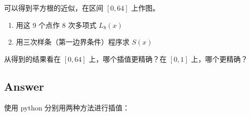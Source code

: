 \documentclass[11pt]{article}
\providecommand{\tightlist}{%
      \setlength{\itemsep}{0pt}\setlength{\parskip}{0pt}}
\begin{document}
可以得到平方根的近似，在区间 \([0, 64]\) 上作图。

\begin{enumerate}
\def\labelenumi{(\arabic{enumi})}
\tightlist
\item
  用这 9 个点作 8 次多项式 \(L_8(x)\)
\item
  用三次样条（第一边界条件）程序求 \(S(x)\)
\end{enumerate}

从得到的结果看在 \([0, 64]\) 上，哪个插值更精确？在 \([0, 1]\)
上，哪个更精确？

\subsection{Answer}\label{answer}

使用 python 分别用两种方法进行插值：
\end{document}
